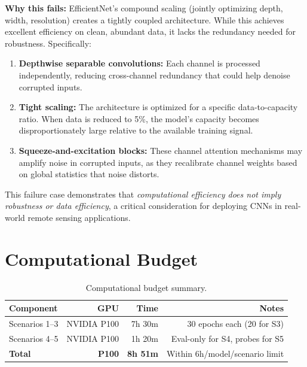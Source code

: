 \documentclass[11pt, a4paper]{article}
\begin{document}
\textbf{Why this fails:} EfficientNet's compound scaling (jointly optimizing depth, width, resolution) creates a tightly coupled architecture. While this achieves excellent efficiency on clean, abundant data, it lacks the redundancy needed for robustness. Specifically:
\begin{enumerate}[nosep]
    \item \textbf{Depthwise separable convolutions:} Each channel is processed independently, reducing cross-channel redundancy that could help denoise corrupted inputs.
    \item \textbf{Tight scaling:} The architecture is optimized for a specific data-to-capacity ratio. When data is reduced to 5\%, the model's capacity becomes disproportionately large relative to the available training signal.
    \item \textbf{Squeeze-and-excitation blocks:} These channel attention mechanisms may amplify noise in corrupted inputs, as they recalibrate channel weights based on global statistics that noise distorts.
\end{enumerate}

This failure case demonstrates that \emph{computational efficiency does not imply robustness or data efficiency}, a critical consideration for deploying CNNs in real-world remote sensing applications.


\section{Computational Budget}

\begin{table}[H]
\centering
\caption{Computational budget summary.}
\label{tab:compute}
\begin{tabular}{lrrr}
\toprule
\textbf{Component} & \textbf{GPU} & \textbf{Time} & \textbf{Notes} \\
\midrule
Scenarios 1--3 & NVIDIA P100 & 7h 30m & 30 epochs each (20 for S3) \\
Scenarios 4--5 & NVIDIA P100 & 1h 20m & Eval-only for S4, probes for S5 \\
\midrule
\textbf{Total} & \textbf{P100} & \textbf{8h 51m} & Within 6h/model/scenario limit \\
\bottomrule
\end{tabular}
\end{table}
\end{document}
